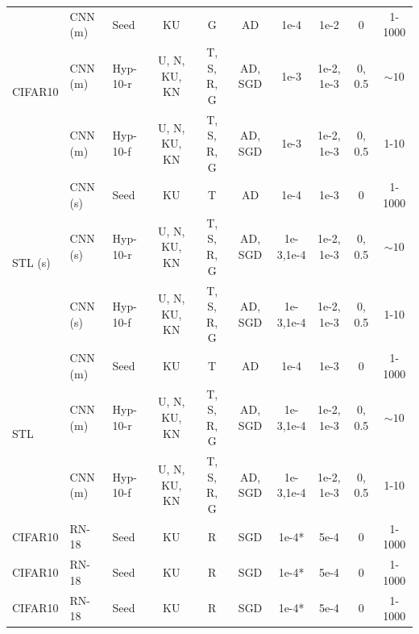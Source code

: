 \begin{table}[]
{{\begin{tabular}{@{}lllccccccc@{}}
\multirow{3}{*}{CIFAR10}       & CNN (m) & Seed          & KU            & G              & AD          & 1e-4      & 1e-2            & 0           & 1-1000 \\
                               & CNN (m) & Hyp-10-r   & U, N, KU, KN & T, S, R, G     & AD, SGD     & 1e-3      & 1e-2, 1e-3      & 0, 0.5      & $\sim 10$        \\
                               & CNN (m) & Hyp-10-f    & U, N, KU, KN & T, S, R, G     & AD, SGD     & 1e-3      & 1e-2, 1e-3      & 0, 0.5      & 1-10   \\
\cmidrule(r){1-1} \cmidrule(rl){2-2}  \cmidrule(rl){3-3} \cmidrule(rl){4-4} \cmidrule(rl){5-5}  \cmidrule(rl){6-6}  \cmidrule(rl){7-7}  \cmidrule(rl){8-8}  \cmidrule(rl){9-9} \cmidrule(rl){10-10} 
\multirow{3}{*}{STL (s)}       & CNN (s) & Seed          & KU            & T              & AD          & 1e-4      & 1e-3            & 0           & 1-1000 \\
                               & CNN (s) & Hyp-10-r   & U, N, KU, KN & T, S, R, G     & AD, SGD     & 1e-3,1e-4 & 1e-2, 1e-3      & 0, 0.5      & $\sim 10$        \\
                               & CNN (s) & Hyp-10-f    & U, N, KU, KN & T, S, R, G     & AD, SGD     & 1e-3,1e-4 & 1e-2, 1e-3      & 0, 0.5      & 1-10   \\
\cmidrule(r){1-1} \cmidrule(rl){2-2}  \cmidrule(rl){3-3} \cmidrule(rl){4-4} \cmidrule(rl){5-5}  \cmidrule(rl){6-6}  \cmidrule(rl){7-7}  \cmidrule(rl){8-8}  \cmidrule(rl){9-9} \cmidrule(rl){10-10} 
\multirow{3}{*}{STL}       & CNN (m) & Seed          & KU            & T              & AD          & 1e-4      & 1e-3            & 0           & 1-1000 \\
                               & CNN (m) & Hyp-10-r   & U, N, KU, KN & T, S, R, G     & AD, SGD     & 1e-3,1e-4 & 1e-2, 1e-3      & 0, 0.5      & $\sim 10$        \\
                               & CNN (m) & Hyp-10-f    & U, N, KU, KN & T, S, R, G & AD, SGD & 1e-3,1e-4 & 1e-2, 1e-3      & 0, 0.5      & 1-10   \\ 
\cmidrule(r){1-1} \cmidrule(rl){2-2}  \cmidrule(rl){3-3} \cmidrule(rl){4-4} \cmidrule(rl){5-5}  \cmidrule(rl){6-6}  \cmidrule(rl){7-7}  \cmidrule(rl){8-8}  \cmidrule(rl){9-9} \cmidrule(rl){10-10} 
CIFAR10                         & RN-18 & Seed          & KU            & R              & SGD          & 1e-4*      & 5e-4            & 0           & 1-1000 \\
CIFAR10                         & RN-18 & Seed          & KU            & R              & SGD          & 1e-4*      & 5e-4            & 0           & 1-1000 \\
CIFAR10                         & RN-18 & Seed          & KU            & R              & SGD          & 1e-4*      & 5e-4            & 0           & 1-1000 \\

\bottomrule
\end{tabular}
}
}
\vspace{-12pt}
\end{table}

